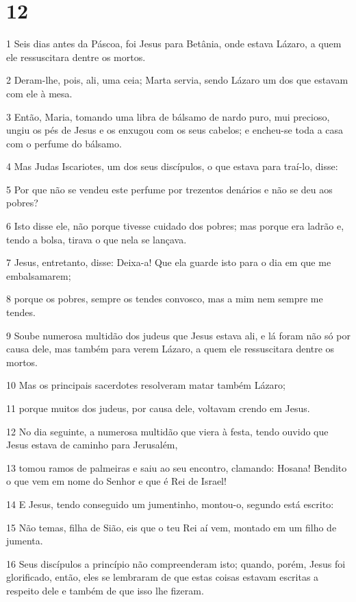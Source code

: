 \chapter{12}

\par 1 Seis dias antes da Páscoa, foi Jesus para Betânia, onde estava Lázaro, a quem ele ressuscitara dentre os mortos.
\par 2 Deram-lhe, pois, ali, uma ceia; Marta servia, sendo Lázaro um dos que estavam com ele à mesa.
\par 3 Então, Maria, tomando uma libra de bálsamo de nardo puro, mui precioso, ungiu os pés de Jesus e os enxugou com os seus cabelos; e encheu-se toda a casa com o perfume do bálsamo.
\par 4 Mas Judas Iscariotes, um dos seus discípulos, o que estava para traí-lo, disse:
\par 5 Por que não se vendeu este perfume por trezentos denários e não se deu aos pobres?
\par 6 Isto disse ele, não porque tivesse cuidado dos pobres; mas porque era ladrão e, tendo a bolsa, tirava o que nela se lançava.
\par 7 Jesus, entretanto, disse: Deixa-a! Que ela guarde isto para o dia em que me embalsamarem;
\par 8 porque os pobres, sempre os tendes convosco, mas a mim nem sempre me tendes.
\par 9 Soube numerosa multidão dos judeus que Jesus estava ali, e lá foram não só por causa dele, mas também para verem Lázaro, a quem ele ressuscitara dentre os mortos.
\par 10 Mas os principais sacerdotes resolveram matar também Lázaro;
\par 11 porque muitos dos judeus, por causa dele, voltavam crendo em Jesus.
\par 12 No dia seguinte, a numerosa multidão que viera à festa, tendo ouvido que Jesus estava de caminho para Jerusalém,
\par 13 tomou ramos de palmeiras e saiu ao seu encontro, clamando: Hosana! Bendito o que vem em nome do Senhor e que é Rei de Israel!
\par 14 E Jesus, tendo conseguido um jumentinho, montou-o, segundo está escrito:
\par 15 Não temas, filha de Sião, eis que o teu Rei aí vem, montado em um filho de jumenta.
\par 16 Seus discípulos a princípio não compreenderam isto; quando, porém, Jesus foi glorificado, então, eles se lembraram de que estas coisas estavam escritas a respeito dele e também de que isso lhe fizeram.
